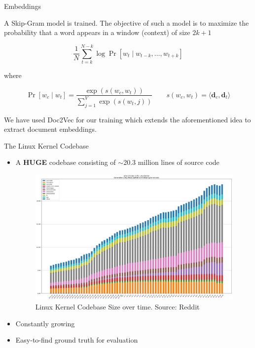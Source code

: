 \documentclass{beamer}
\renewcommand{\vec}{\mathbf}
\begin{document}
\begin{frame}{Embeddings}

A Skip-Gram model is trained. The objective of such a model is to maximize the probability that a word appears in a window (context) of size $2k + 1$

$$\frac {1} {N} \sum_{t = k}^{N - k} \log \Pr [w_t \mid w_{t-k}, \dots, w_{t + k}]$$

where 

$$\Pr [w_c \mid w_t] = \frac {\exp(s(w_c, w_t))} {\sum_{j = 1}^{V} \exp(s(w_t, j))} \qquad s(w_c, w_t) = \langle \vec d_c, \vec d_t \rangle$$

We have used Doc2Vec for our training which extends the aforementioned idea to extract document embeddings.
    
\end{frame}

\begin{frame}{The Linux Kernel Codebase}
    \begin{itemize}
        \item A \textbf{HUGE} codebase consisting of $\sim$20.3 million lines of source code
        \begin{figure}
            \centering
            \includegraphics[scale=0.15]{linux.png}
            \caption{Linux Kernel Codebase Size over time. Source: Reddit}
            \label{fig:linux}
        \end{figure}
        
        \item Constantly growing
        \item Easy-to-find ground truth for evaluation
    \end{itemize}
    
    
\end{frame}
\end{document}

